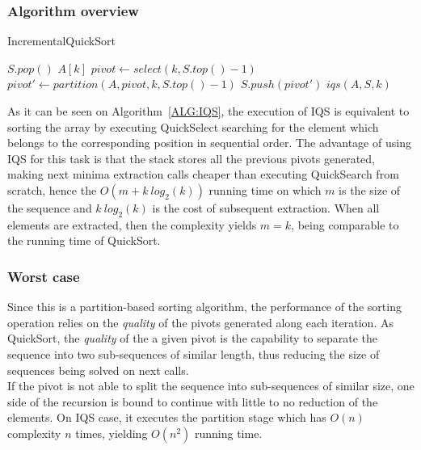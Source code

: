 \subsubsection{Algorithm overview}

\begin{algorithm}
  \caption{IncrementalQuickSort}\label{ALG:IQS}
  \begin{algorithmic}[1]
    \State $S.pop()$
    \Return $A[k]$
    \EndIf
    \State $pivot \gets select(k, S.top()-1)$
    \State $pivot' \gets partition(A,pivot,k, S.top()-1)$
    \State $S.push(pivot')$
    \State \Return $iqs(A,S,k)$
    \EndProcedure
  \end{algorithmic}
\end{algorithm}

As it can be seen on Algorithm~\ref{ALG:IQS}, the execution of IQS is equivalent to sorting the array by executing QuickSelect searching for the element which belongs to the corresponding position in sequential order. The advantage of using IQS for this task is that the stack stores all the previous pivots generated, making next minima extraction calls cheaper than executing QuickSearch from scratch, hence the $O(m + k~log_2(k) ) $ running time on which $m$ is the size of the sequence and $k~log_2(k)$ is the cost of subsequent extraction. When all elements are extracted, then the complexity yields $m = k$, being comparable to the running time of QuickSort.\\

\subsubsection{Worst case}
Since this is a partition-based sorting algorithm, the performance of the sorting operation relies on the \textit{quality} of the pivots generated along each iteration. As QuickSort, the \textit{quality} of the a given pivot is the capability to separate the sequence into two sub-sequences of similar length, thus reducing the size of sequences being solved on next calls.\\

If the pivot is not able to split the sequence into sub-sequences of similar size, one side of the recursion is bound to continue with little to no reduction of the elements. On IQS case, it executes the partition stage which has $O(n)$ complexity $n$ times, yielding $O(n^2)$ running time.\\

